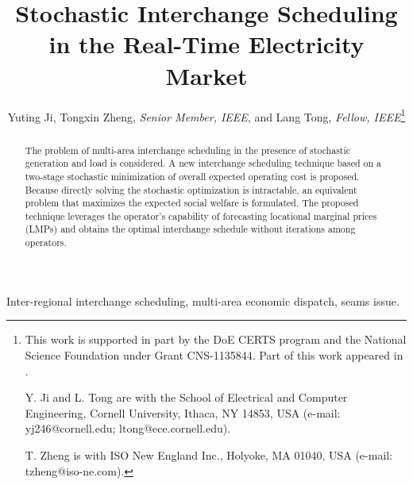\documentclass[conference]{IEEEtran}
\begin{document}
\title{Stochastic Interchange Scheduling in the Real-Time Electricity Market}

\author{Yuting Ji, Tongxin Zheng, {\em Senior Member, IEEE}, and  Lang Tong, {\em Fellow, IEEE}\thanks {\scriptsize This work is supported in part by the DoE CERTS program and the National Science Foundation under Grant CNS-1135844. Part of this work appeared in \cite{JiTong15PESGM}.

Y. Ji and L. Tong are with the School of Electrical and Computer Engineering, Cornell University, Ithaca, NY 14853, USA (e-mail: yj246@cornell.edu; ltong@ece.cornell.edu).

T. Zheng is with ISO New England Inc., Holyoke, MA 01040, USA (e-mail: tzheng@iso-ne.com).}}
\maketitle

\begin{abstract}
The problem of multi-area interchange scheduling in the presence of stochastic generation and load is considered.   A new interchange scheduling technique based on a two-stage stochastic minimization of overall expected operating cost is proposed.  Because directly solving the stochastic optimization is intractable, an equivalent problem that maximizes the expected social welfare is formulated. The proposed technique leverages the operator's capability of forecasting locational marginal prices (LMPs) and obtains the optimal interchange schedule without iterations among operators.
\end{abstract}

\begin{IEEEkeywords}
Inter-regional interchange scheduling, multi-area economic dispatch, seams issue.
\end{IEEEkeywords}

\IEEEpeerreviewmaketitle
\end{document}
